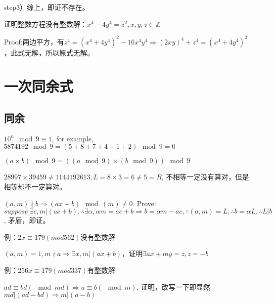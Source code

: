 \documentclass[UTF8]{../09-Mathematics}
\begin{document}
step3）综上，即证不存在。


\begin{proposition}
    证明整数方程没有整数解：$x^4-4y^4 = z^2, x,y,z \in \mathbb Z$

    Proof:两边平方，有$z^4 = (x^4+4y^4)^2 - 16x^4y^4 \Rightarrow (2xy)^4 + z^4 = (x^4+4y^4)^2$，此式无解，所以原式无解。
\end{proposition}

\section{一次同余式}

\subsection{同余}

\begin{proposition}
    $10^n \mod 9 \equiv 1$, for example, $5874192 \mod 9 = (5+8+7+4+1+2) \mod 9  = 0$
\end{proposition}

\begin{proposition}
    $(a \times b) \mod 9 =  ((a \mod 9 )\times (b \mod 9) ) \mod 9 $

    $28997 \times 39459  \neq 1144192613, L = 8 \times 3 = 6 \neq 5=R$, 不相等一定没有算对，但是相等却不一定算对。
\end{proposition}


\begin{proposition}
    $(a,m) \nmid b \Rightarrow (ax+b) \mod (m) \neq 0$. Prove:$suppose \ \exists c, m | (ac+b), \therefore \exists \alpha, \alpha m = ac+b \Rightarrow b=\alpha m -ac, \because (a,m) = L, \therefore b = \alpha L, \therefore L | b$, 矛盾，即证。

    例：$2x \equiv 179(mod 562)$没有整数解
\end{proposition}

\begin{proposition}
    $(a,m) =1, m \nmid a \Rightarrow \exists x, m | (ax+b)$，证明$\exists ax+my = z, z = -b$

    例：$256x \equiv 179 (mod 337)$有整数解
\end{proposition}


\begin{proposition}
    $ad \equiv bd (\mod md) \Rightarrow a \equiv b (\mod m)$, 证明，改写一下即显然$md |(ad-bd) \Rightarrow m|(a-b)$
\end{proposition}
\end{document}
